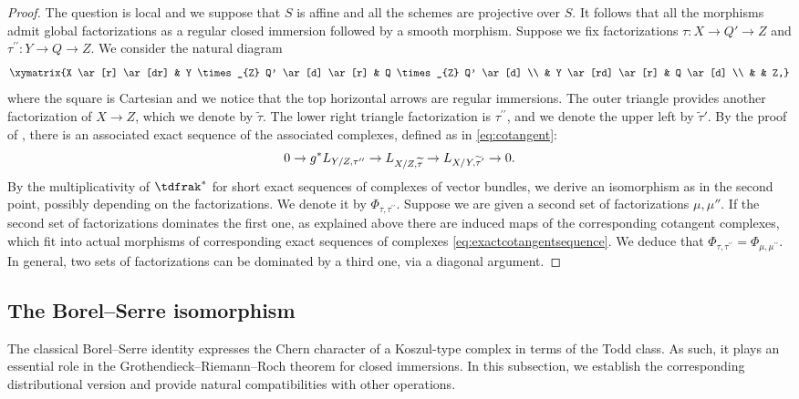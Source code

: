 \begin{proof}
The question is local and we suppose that $S$ is affine and all the schemes are projective over $S$. It follows that all the morphisms admit global factorizations as a regular closed immersion followed by a smooth morphism. Suppose we fix factorizations $\tau\colon X\to Q'\to Z$ and $\tau^{\prime\prime}\colon Y\to Q\to Z$. We consider the natural diagram
\begin{displaymath}
\xymatrix{X \ar[r] \ar[dr] & Y \times_{Z} Q' \ar[d] \ar[r] & Q \times_{Z} Q' \ar[d] \\
& Y \ar[rd] \ar[r] & Q \ar[d] \\
& & Z,}
\end{displaymath}
where the square is Cartesian and we notice that the top horizontal arrows are regular immersions. The outer triangle provides another factorization of $X\to Z$, which we denote by $\widetilde{\tau}$. The lower right triangle factorization is $\tau^{\prime \prime}$, and we denote the upper left by $\widetilde{\tau}'$. By the proof of \cite[Exp.\,VIII, Prop.\,2.6]{SGA6}, there is an associated exact sequence of the associated complexes, defined as in \eqref{eq:cotangent}:
\begin{equation}\label{eq:exactcotangentsequence}
0 \to g^{\ast} L_{Y/Z, \tau^{\prime \prime}} \to L_{X/Z, \widetilde{\tau}}\to L_{\substack{\vspace{-0.08cm}\\ X/Y, \widetilde{\tau}^{\prime}}}\to 0.
\end{equation}
By the multiplicativity of $\tdfrak^{\ast}$ for short exact sequences of complexes of vector bundles, we derive an isomorphism as in the second point, possibly depending on the factorizations. We denote it by $\Phi_{\tau,\tau^{\prime\prime}}$.
Suppose we are given a second set of factorizations $\mu, \mu''$. If the second set of factorizations dominates the first one, as explained above there are induced maps of the corresponding cotangent complexes, which fit into actual morphisms of corresponding exact sequences of complexes \eqref{eq:exactcotangentsequence}. We deduce that $\Phi_{\tau,\tau^{\prime\prime}}=\Phi_{\mu,\mu^{\prime \prime}}$. In general, two sets of factorizations can be dominated by a third one, via a diagonal argument.
\end{proof}

\subsection{The Borel--Serre isomorphism}\label{subsec:Borel-Serre}
\mbox{}\hspace*{-2mm}
The classical Borel--Serre identity \hbox{\cite[Lem.\,18]{Borel-Serre}} expresses the Chern character of a Koszul-type complex in terms of the Todd class. As such, it plays an essential role in the Grothendieck--Riemann--Roch theorem for closed immersions. In this subsection, we establish the corresponding distributional version and provide natural compatibilities with other operations.

